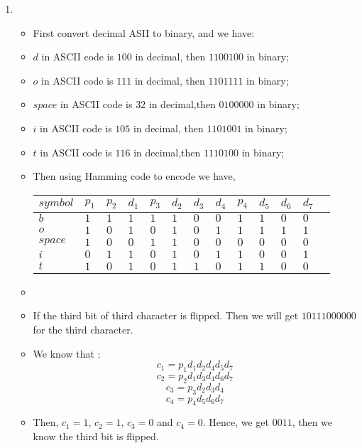 \documentclass[11pt,twoside]{article}
\begin{document}
\begin{enumerate}[leftmargin=0pt]
\item
\begin{itemize}[label = {}]
	\item First convert decimal ASII to binary, and we have:
	\item $d$ in ASCII code is $100$ in decimal, then $1100100$ in binary;
	\item $o$ in ASCII code is $111$ in decimal, then $1101111$  in binary;
	\item $space$ in ASCII code is $32$ in decimal,then $0100000$  in binary;
	\item $i$ in ASCII code is $105$ in decimal, then $1101001$  in binary;
	\item $t$ in ASCII code is $116$ in decimal,then $1110100$  in binary;
	\item Then using Hamming code to encode we have,
        \begin{longtable}{|>{\tiny}p{0.3in}|>{\tiny} p{0.1in}| >{\tiny}p{0.1in}|>{\tiny}p{0.1in}|>{\tiny} p{0.1in}|>{\tiny}p{0.1in}
        |>{\tiny}p{0.1in}|>{\tiny}p{0.1in}|>{\tiny}p{0.1in}|>{\tiny}p{0.1in}|>{\tiny}p{0.1in}|>{\tiny}p{0.1in}|>{\tiny}p{0.1in}}
        \hline
       $symbol$&$p_1$&$p_2$&$d_1$&$p_3$&$d_2$&$d_3$&$d_4$&$p_4$&$d_5$&$d_6$&$d_7$\\[0.1in]\hline
	$b	     $&$1    $&$1    $&$1    $&$1    $&$1    $&$0    $&$0   $&$1    $&$1    $&$0    $&$0    $\\[0.1in]\hline
	$o	     $&$1    $&$0    $&$1    $&$0    $&$1    $&$0    $&$1   $&$1    $&$1    $&$1    $&$1    $\\[0.1in]\hline
	$space  $&$1    $&$0    $&$0    $&$1    $&$1    $&$0    $&$0   $&$0    $&$0    $&$0    $&$0    $\\[0.1in]\hline
	$i	     $&$0    $&$1    $&$1    $&$0    $&$1    $&$0    $&$1   $&$1    $&$0    $&$0    $&$1    $\\[0.1in]\hline
	$t	     $&$1    $&$0    $&$1    $&$0    $&$1    $&$1    $&$0   $&$1    $&$1    $&$0    $&$0    $\\[0.1in]\hline
	\end{longtable}
	\item 
	\item If the third bit of third character is flipped. Then we will get ${10} 1 {1} 100 {0} 000$ for the third character.
	\item We know that : 
		\[c_1 = p_1d_1d_2d_4d_5d_7\]
		\[c_2 = p_2d_1d_3d_4d_6d_7\]
		\[c_3 = p_3d_2d_3d_4\]
		\[c_4 = p_4d_5d_6d_7\]
	\item Then, $c_1 = 1$, $c_2 = 1$, $c_3 = 0$ and $c_4 = 0$. Hence, we get $0011$, then we know the third bit is flipped.
\end{itemize}
\end{enumerate}
\end{document}
